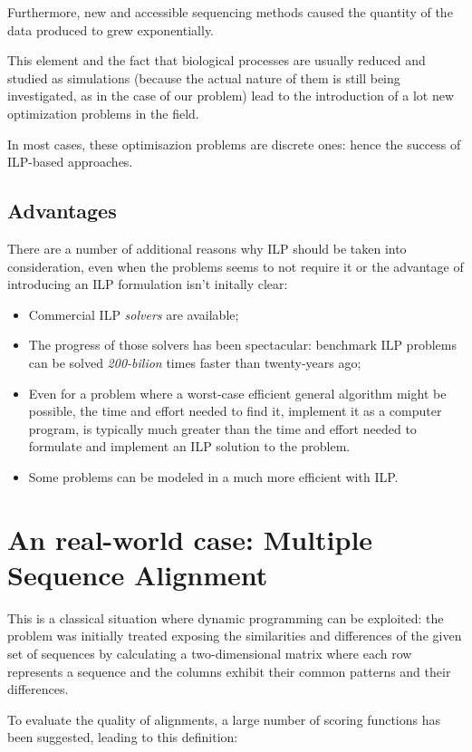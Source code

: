 Furthermore, new and accessible sequencing methods caused the quantity of the data produced to grew exponentially.

This element and the fact that biological processes are usually reduced and studied as simulations (because the actual nature of them is still being investigated, as in the case of our problem) lead to the introduction of a lot new optimization problems in the field.

In most cases, these optimisazion problems are discrete ones: hence the success of ILP-based approaches.

\subsection{Advantages}

There are a number of additional reasons why ILP should be taken into consideration, even when the problems seems to not require it or the advantage of introducing an ILP formulation isn't initally clear:

\begin{itemize}
	\item Commercial ILP \textit{solvers} are available;
	\item The progress of those solvers has been spectacular: benchmark ILP problems can be solved \textit{200-bilion} times faster than twenty-years ago;
	\item Even for a problem where a worst-case efficient general algorithm might be possible, the time and effort needed to find it, implement it as a computer program, is typically much greater than the time and effort needed to formulate and implement an ILP solution to the problem.
	\item Some problems can be modeled in a much more efficient with ILP.
\end{itemize}

\section{An real-world case: Multiple Sequence Alignment}

This is a classical situation where dynamic programming can be exploited: the problem was initially treated exposing the similarities and differences of the given set of sequences by calculating a two-dimensional matrix where each row represents a sequence and the columns exhibit their common patterns and their differences.

To evaluate the quality of alignments, a large number of scoring functions has been suggested, leading to this definition:

